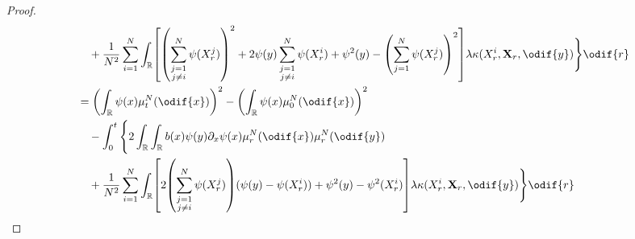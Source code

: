\begin{proof}
\begin{equation}
\begin{split}
                                               & \quad + \frac{1}{N^2} \sum_{i=1}^N \int_\potspace \sbr*{ \br*{ \sum_{\substack{j=1                                                                                                                                                                                                                         \\ j \neq i}}^N \psi(X_r^j) }^2 + 2 \psi(y) \sum_{\substack{j=1 \\ j \neq i}}^N \psi(X_r^i) + \psi^2(y) - \br*{ \sum_{j=1}^N \psi(X_r^j) }^2 } \lambda \kappa(X_r^i,\bm{X}_r,\odif{y}) \Bigg\} \odif{r} \\
                                               & = \br*{ \int_\potspace \psi(x) \mu_t^N(\odif{x}) }^2 - \br*{ \int_\potspace \psi(x) \mu_0^N(\odif{x}) }^2                                                                                                                                                                            \\
                                               & \quad {} - \int_0^t \Bigg\{ 2 \int_\potspace \int_\potspace b(x) \psi(y) \partial_x \psi (x) \mu_r^N(\odif{x}) \mu_r^N(\odif{y})                                                                                                                                                       \\
                                               & \quad + \frac{1}{N^2} \sum_{i=1}^N \int_\potspace \sbr*{ 2 \br*{\sum_{\substack{j=1                                                                                                                                                                                                                        \\ j \neq i}}^N \psi(X_r^j)} (\psi(y) - \psi(X_r^i)) + \psi^2(y) - \psi^2(X_r^i) } \lambda \kappa(X_r^i,\bm{X}_r,\odif{y}) \Bigg\} \odif{r} \\

\end{split}
\end{equation}
\end{proof}
